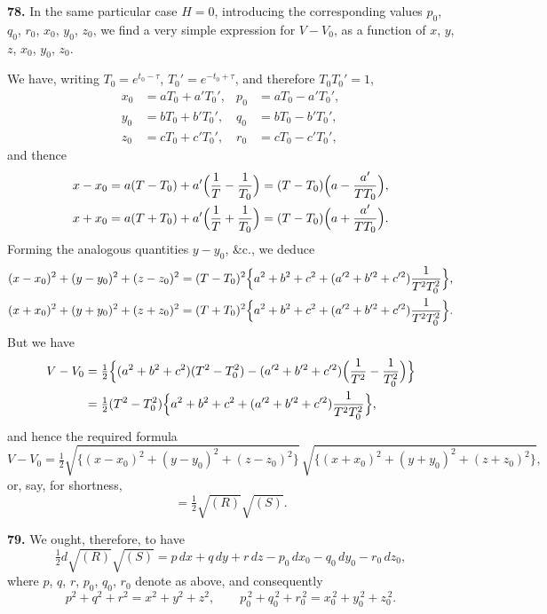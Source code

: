 \documentclass[11pt,a4paper]{book}
\begin{document}
\smallskip

\noindent\textbf{78.} In the same particular case $H = 0$, introducing the corresponding values $p_0$, $q_0$, $r_0$, $x_0$, $y_0$, $z_0$, we find a very simple expression for $V - V_0$, as a function of $x$, $y$, $z$, $x_0$, $y_0$, $z_0$.

We have, writing $T_0 = e^{t_0 - \tau}$, $T_0' = e^{-t_0 + \tau}$, and therefore $T_0 T_0' = 1$,
\begin{align*}
x_0 &= aT_0 + a' T_0', & p_0 &= aT_0 - a' T_0', \\
y_0 &= bT_0 + b' T_0', & q_0 &= bT_0 - b' T_0', \\
z_0 &= cT_0 + c' T_0', & r_0 &= cT_0 - c' T_0',
\end{align*}
and thence
\begin{align*}
x - x_0 &= a(T - T_0) + a'\Bigl(\frac{1}{T} - \frac{1}{T_0}\Bigr) = (T - T_0)\Bigl(a - \frac{a'}{TT_0}\Bigr), \\
x + x_0 &= a(T + T_0) + a'\Bigl(\frac{1}{T} + \frac{1}{T_0}\Bigr) = (T - T_0)\Bigl(a + \frac{a'}{TT_0}\Bigr).
\end{align*}
Forming the analogous quantities $y - y_0$, \&c., we deduce
\begin{align*}
(x - x_0)^2 + (y - y_0)^2 + (z - z_0)^2 &= (T - T_0)^2 \Bigl\{a^2 + b^2 + c^2 + (a'^2 + b'^2 + c'^2)\frac{1}{T^2 T_0^2}\Bigr\}, \\
(x + x_0)^2 + (y + y_0)^2 + (z + z_0)^2 &= (T + T_0)^2 \Bigl\{a^2 + b^2 + c^2 + (a'^2 + b'^2 + c'^2)\frac{1}{T^2 T_0^2}\Bigr\}.
\end{align*}
But we have
\begin{align*}
V - V_0 &= \tfrac{1}{2}\Bigl\{(a^2 + b^2 + c^2)(T^2 - T_0^2) - (a'^2 + b'^2 + c'^2)\Bigl(\frac{1}{T^2} - \frac{1}{T_0^2}\Bigr)\Bigr\} \\
&= \tfrac{1}{2}(T^2 - T_0^2)\Bigl\{a^2 + b^2 + c^2 + (a'^2 + b'^2 + c'^2)\frac{1}{T^2 T_0^2}\Bigr\},
\end{align*}
and hence the required formula
\[
V - V_0 = \tfrac{1}{2}\sqrt{\{(x - x_0)^2 + (y - y_0)^2 + (z - z_0)^2\}}\,\sqrt{\{(x + x_0)^2 + (y + y_0)^2 + (z + z_0)^2\}},
\]
or, say, for shortness,
\[
= \tfrac{1}{2}\sqrt{(R)}\sqrt{(S)}.
\]

\smallskip

\noindent\textbf{79.} We ought, therefore, to have
\[
\tfrac{1}{2}d\sqrt{(R)}\sqrt{(S)} = p\,dx + q\,dy + r\,dz - p_0\,dx_0 - q_0\,dy_0 - r_0\,dz_0,
\]
where $p$, $q$, $r$, $p_0$, $q_0$, $r_0$ denote as above, and consequently
\[
p^2 + q^2 + r^2 = x^2 + y^2 + z^2, \qquad p_0^{\,2} + q_0^{\,2} + r_0^{\,2} = x_0^{\,2} + y_0^{\,2} + z_0^{\,2}.
\]
\end{document}
